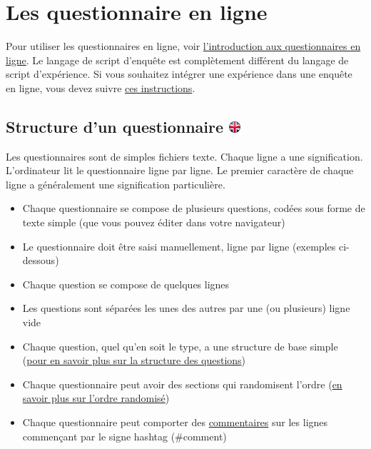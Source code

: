 \documentclass[
]{book}
\providecommand{\tightlist}{%
  \setlength{\itemsep}{0pt}\setlength{\parskip}{0pt}}
\begin{document}
\hypertarget{s8}{%
\chapter{Les questionnaire en ligne}\label{s8}}

Pour utiliser les questionnaires en ligne, voir \protect\hyperlink{s7}{l'introduction aux questionnaires en ligne}.
Le langage de script d'enquête est complètement différent du langage de script d'expérience. Si vous souhaitez intégrer une expérience dans une enquête en ligne, vous devez suivre \href{https://www.psytoolkit.org/doc3.2.0/online-survey-syntax.html\#experiment}{ces instructions}.

\hypertarget{structure-dun-questionnaire}{%
\section[Structure d'un questionnaire ]{\texorpdfstring{Structure d'un questionnaire \href{https://www.psytoolkit.org/doc3.4.0/online-survey-syntax.html\#_structure_of_questionnaire}{\protect\includegraphics{img/ukflag.png}}}{Structure d'un questionnaire }}\label{structure-dun-questionnaire}}

Les questionnaires sont de simples fichiers texte. Chaque ligne a une signification. L'ordinateur lit le questionnaire ligne par ligne. Le premier caractère de chaque ligne a généralement une signification particulière.

\begin{itemize}
\tightlist
\item
  Chaque questionnaire se compose de plusieurs questions, codées sous forme de texte simple (que vous pouvez éditer dans votre navigateur)
\item
  Le questionnaire doit être saisi manuellement, ligne par ligne (exemples ci-dessous)
\item
  Chaque question se compose de quelques lignes
\item
  Les questions sont séparées les unes des autres par une (ou plusieurs) ligne vide
\item
  Chaque question, quel qu'en soit le type, a une structure de base simple (\protect\hyperlink{s8-1-1}{pour en savoir plus sur la structure des questions})
\item
  Chaque questionnaire peut avoir des sections qui randomisent l'ordre (\protect\hyperlink{randomization}{en savoir plus sur l'ordre randomisé})
\item
  Chaque questionnaire peut comporter des \protect\hyperlink{}{commentaires} sur les lignes commençant par le signe hashtag (\#comment)
\end{itemize}
\end{document}
